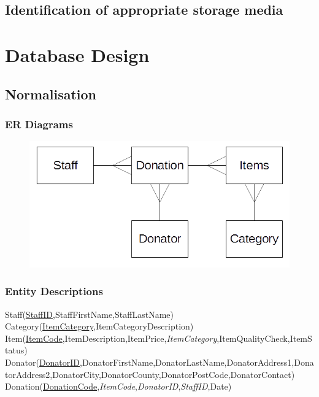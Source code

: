 \subsection{Identification of appropriate storage media}

\section{Database Design}

\subsection{Normalisation}

\subsubsection{ER Diagrams}
\begin{figure}[H]
    \includegraphics[width=\textwidth]{./Design/Images/ERDiagram.png}
\end{figure}

\subsubsection{Entity Descriptions}
Staff(\underline{StaffID},StaffFirstName,StaffLastName)
Category(\underline{ItemCategory},ItemCategoryDescription)
Item(\underline{ItemCode},ItemDescription,ItemPrice,\textit{ItemCategory},ItemQualityCheck,ItemStatus)
Donator(\underline{DonatorID},DonatorFirstName,DonatorLastName,DonatorAddress1,DonatorAddress2,DonatorCity,DonatorCounty,DonatorPostCode,DonatorContact)
Donation(\underline{DonationCode},\textit{ItemCode},\textit{DonatorID},\textit{StaffID},Date)


